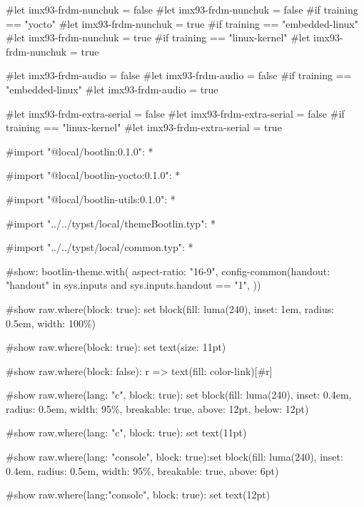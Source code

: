 #let imx93-frdm-nunchuk = false
#let imx93-frdm-nunchuk = false
#if training == "yocto" {#let imx93-frdm-nunchuk = true}
#if training == "embedded-linux" {#let imx93-frdm-nunchuk = true}
#if training == "linux-kernel" {#let imx93-frdm-nunchuk = true}

#let imx93-frdm-audio = false
#let imx93-frdm-audio = false
#if training == "embedded-linux" {#let imx93-frdm-audio = true}

#let imx93-frdm-extra-serial = false
#let imx93-frdm-extra-serial = false
#if training == "linux-kernel" {#let imx93-frdm-extra-serial = true}

#import "@local/bootlin:0.1.0": *

#import "@local/bootlin-yocto:0.1.0": *

#import "@local/bootlin-utils:0.1.0": *

#import "../../typst/local/themeBootlin.typ": *

#import "../../typst/local/common.typ": *

#show: bootlin-theme.with( aspect-ratio: "16-9", config-common(handout: "handout" in sys.inputs and sys.inputs.handout == "1", ))

#show raw.where(block: true): set block(fill: luma(240), inset: 1em, radius: 0.5em, width: 100\%)

#show raw.where(block: true): set text(size: 11pt)

#show raw.where(block: false): r => text(fill: color-link)[#r]

#show raw.where(lang: "c", block: true): set block(fill: luma(240), inset: 0.4em, radius: 0.5em, width: 95\%, breakable: true, above: 12pt, below: 12pt)

#show raw.where(lang: "c", block: true): set text(11pt)

#show raw.where(lang: "console", block: true):set block(fill: luma(240), inset: 0.4em, radius: 0.5em, width: 95\%, breakable: true, above: 6pt)

#show raw.where(lang:"console", block: true): set text(12pt)


